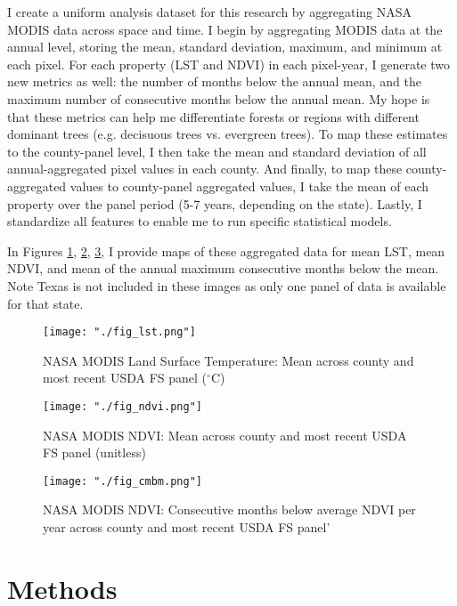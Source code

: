 \documentclass{article}
\begin{document}
I create a uniform analysis dataset for this research by aggregating NASA MODIS data across space and time. I begin by aggregating MODIS data at the annual level, storing the mean, standard deviation, maximum, and minimum at each pixel. For each property (LST and NDVI) in each pixel-year, I generate two new metrics as well: the number of months below the annual mean, and the maximum number of consecutive months below the annual mean. My hope is that these metrics can help me differentiate forests or regions with different dominant trees (e.g. decisuous trees vs. evergreen trees). To map these estimates to the county-panel level, I then take the mean and standard deviation of all annual-aggregated pixel values in each county. And finally, to map these county-aggregated values to county-panel aggregated values, I take the mean of each property over the panel period (5-7 years, depending on the state). Lastly, I standardize all features to enable me to run specific statistical models.

In Figures \ref{fig:lst}, \ref{fig:ndvi}, \ref{fig:cmbm}, I provide maps of these aggregated data for mean LST, mean NDVI, and mean of the annual maximum consecutive months below the mean. Note Texas is not included in these images as only one panel of data is available for that state. 

\begin{figure}[!htbp]
  \centering
  \texttt{[image: "./fig\_lst.png"]}
  \caption{\label{fig:lst} NASA MODIS Land Surface Temperature: Mean across county and most recent USDA FS panel ($^\circ$C)}
\end{figure}

\begin{figure}[!htbp]
  \centering
  \texttt{[image: "./fig\_ndvi.png"]}
  \caption{\label{fig:ndvi} NASA MODIS NDVI: Mean across county and most recent USDA FS panel (unitless)}
\end{figure}

\begin{figure}[!htbp]
  \centering
  \texttt{[image: "./fig\_cmbm.png"]}
  \caption{\label{fig:cmbm} NASA MODIS NDVI: Consecutive months below average NDVI per year across county and most recent USDA FS panel'}
\end{figure}

\section{Methods}
\label{sec:methods}
\end{document}
